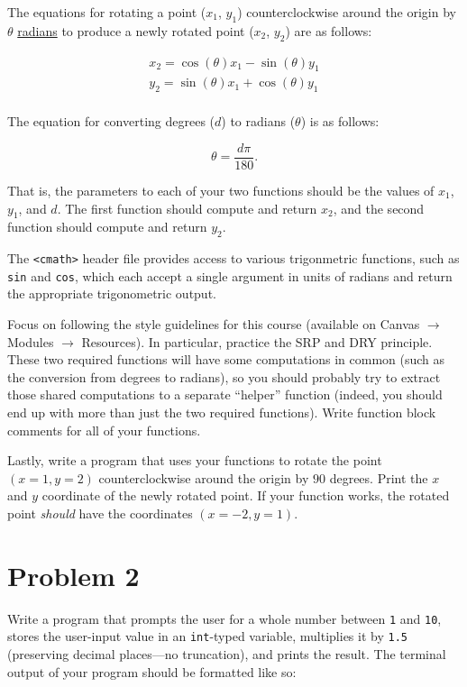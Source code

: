 \documentclass{article}
\newenvironment{hint}
    {\begin{tcolorbox}[title=Hint,colframe=white!70!blue,colback=white]}
    {\end{tcolorbox}}
\begin{document}
The equations for rotating a point ($x_1$, $y_1$) counterclockwise around the origin by $\theta$ \ul{radians} to produce a newly rotated point ($x_2$, $y_2$) are as follows:

\begin{align}
    x_2 = \cos (\theta) x_1 - \sin (\theta) y_1\\
    y_2 = \sin (\theta) x_1 + \cos (\theta) y_1\\
\end{align}

The equation for converting degrees ($d$) to radians ($\theta$) is as follows:

\begin{equation}
    \theta = \frac{d \pi}{180}.
\end{equation}

That is, the parameters to each of your two functions should be the values of $x_1$, $y_1$, and $d$. The first function should compute and return $x_2$, and the second function should compute and return $y_2$.

\begin{hint}
    The \texttt{<cmath>} header file provides access to various trigonmetric functions, such as \texttt{sin} and \texttt{cos}, which each accept a single argument in units of radians and return the appropriate trigonometric output.
\end{hint}

Focus on following the style guidelines for this course (available on Canvas $\rightarrow$ Modules $\rightarrow$ Resources). In particular, practice the SRP and DRY principle. These two required functions will have some computations in common (such as the conversion from degrees to radians), so you should probably try to extract those shared computations to a separate ``helper'' function (indeed, you should end up with more than just the two required functions). Write function block comments for all of your functions.

Lastly, write a program that uses your functions to rotate the point $(x=1, y=2)$ counterclockwise around the origin by $90$ degrees. Print the $x$ and $y$ coordinate of the newly rotated point. If your function works, the rotated point \textit{should} have the coordinates $(x=-2, y=1)$.

\section{Problem 2}

Write a program that prompts the user for a whole number between \texttt{1} and \texttt{10}, stores the user-input value in an \texttt{int}-typed variable, multiplies it by \texttt{1.5} (preserving decimal places---no truncation), and prints the result. The terminal output of your program should be formatted like so:
\end{document}
